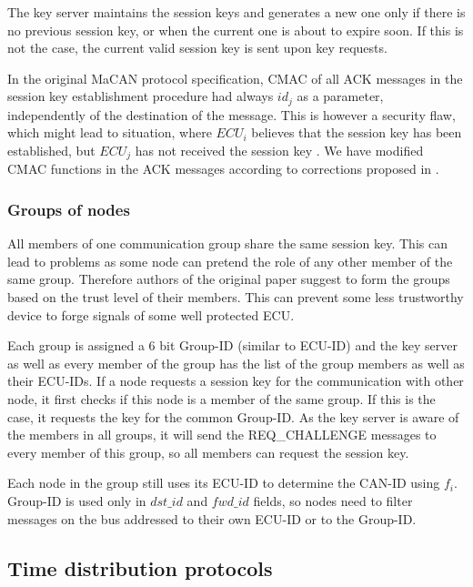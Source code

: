 \documentclass{article}
\begin{document}
The key server maintains the session keys and generates a new one only if there is no previous session key, or when the current one is about to expire soon. If this is not the case, the current valid session key is sent upon key requests.

In the original MaCAN protocol specification, CMAC of all ACK messages in the session key establishment procedure had always $id_j$ as a parameter, independently of the destination of the message. This is however a security flaw, which might lead to situation, where $ECU_i$ believes that the session key has been established, but $ECU_j$ has not received the session key \cite{macananalysis}. We have modified CMAC functions in the ACK messages according to corrections proposed in \cite{macananalysis}.


\subsubsection{Groups of nodes}
\label{sec:groups-nodes}

All members of one communication group share the same session key. This can lead to problems as some node can pretend the role of any other member of the same group. Therefore authors of the original paper suggest to form the groups based on the trust level of their members. This can prevent some less trustworthy device to forge signals of some well protected ECU.

Each group is assigned a 6 bit Group-ID (similar to ECU-ID) and the key server as well as every member of the group has the list of the group members as well as their ECU-IDs. If a node requests a session key for the communication with other node, it first checks if this node is a member of the same group. If this is the case, it requests the key for the common Group-ID. As the key server is aware of the members in all groups, it will send the REQ\_CHALLENGE messages to every member of this group, so all members can request the session key.

Each node in the group still uses its ECU-ID to determine the CAN-ID using $f_i$. Group-ID is used only in $dst\_id$ and $fwd\_id$ fields, so nodes need to filter messages on the bus addressed to their own ECU-ID or to the Group-ID.

\subsection{Time distribution protocols}
\label{sec:auth-time-distr}
\end{document}
